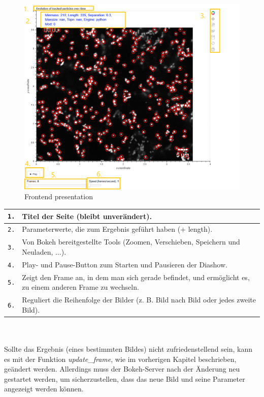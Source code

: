 \begin{enumerate}
	\begin{figure}[H]
    \centering
    \includegraphics[scale=0.5]{Grafiken/bokeh/GUI presentation.png}
    \caption{Frontend presentation}
    \label{fig:kap_App/GUI presentation}
\end{figure} 

\begin{tabular}{|l|p{12cm}|}
\hline
\texttt{1.} & Titel der Seite (bleibt unverändert). \\ \hline
\texttt{2.} & Parameterwerte, die zum Ergebnis geführt haben ($+$ length). \\ \hline
\texttt{3.} & Von Bokeh bereitgestellte Tools (Zoomen, Verschieben, Speichern und Neuladen, ...). \\ \hline
\texttt{4.} & Play- und Pause-Button zum Starten und Pausieren der Diashow. \\ \hline
\texttt{5.} & Zeigt den Frame an, in dem man sich gerade befindet, und ermöglicht es, zu einem anderen Frame zu wechseln. \\ \hline
\texttt{6.} & Reguliert die Reihenfolge der Bilder (z. B. Bild nach Bild oder jedes zweite Bild). \\ \hline
\hline
\end{tabular}
\\ \\

Sollte das Ergebnis (eines bestimmten Bildes) nicht zufriedenstellend sein, kann es mit der Funktion \textit{update\_frame}, wie im vorherigen Kapitel beschrieben, geändert werden. Allerdings muss der Bokeh-Server nach der Änderung neu gestartet werden, um sicherzustellen, dass das neue Bild und seine Parameter angezeigt werden können. 
	
\end{enumerate}



